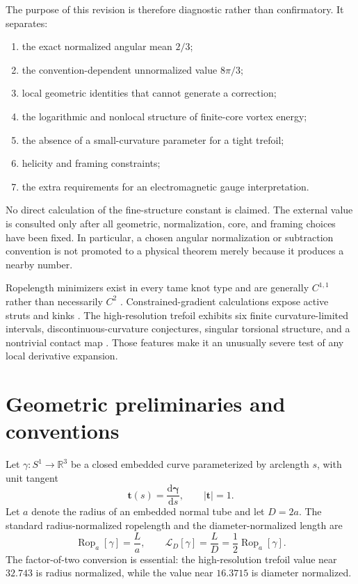 \documentclass[aps,pre,preprint,notitlepage,nofootinbib,superscriptaddress]{revtex4-2}
\newcommand{\dd}{\mathrm d}
\newcommand{\RR}{\mathbb R}
\newcommand{\Rop}{\operatorname{Rop}}
\newcommand{\calL}{\mathcal L}
\begin{document}
The purpose of this revision is therefore diagnostic rather than confirmatory.  It separates:
\begin{enumerate}[label=(\roman*)]
  \item the exact normalized angular mean $2/3$;
  \item the convention-dependent unnormalized value $8\pi/3$;
  \item local geometric identities that cannot generate a correction;
  \item the logarithmic and nonlocal structure of finite-core vortex energy;
  \item the absence of a small-curvature parameter for a tight trefoil;
  \item helicity and framing constraints;
  \item the extra requirements for an electromagnetic gauge interpretation.
\end{enumerate}

No direct calculation of the fine-structure constant is claimed.  The external value is consulted only after all geometric, normalization, core, and framing choices have been fixed.  In particular, a chosen angular normalization or subtraction convention is not promoted to a physical theorem merely because it produces a nearby number.

Ropelength minimizers exist in every tame knot type and are generally $C^{1,1}$ rather than necessarily $C^2$ \cite{CantarellaKusnerSullivan2002}.  Constrained-gradient calculations expose active struts and kinks \cite{AshtonCantarellaPiatekRawdon2011}.  The high-resolution trefoil exhibits six finite curvature-limited intervals, discontinuous-curvature conjectures, singular torsional structure, and a nontrivial contact map \cite{PrzybylPieranski2014}.  Those features make it an unusually severe test of any local derivative expansion.

\section{Geometric preliminaries and conventions}
\label{sec:geometry}

Let $\gamma:S^1\to\RR^3$ be a closed embedded curve parameterized by arclength $s$, with unit tangent
\begin{equation}
  \bm t(s)=\frac{\dd\bm\gamma}{\dd s},\qquad |\bm t|=1.
\end{equation}
Let $a$ denote the radius of an embedded normal tube and let $D=2a$.  The standard radius-normalized ropelength and the diameter-normalized length are
\begin{equation}
  \Rop_a[\gamma]=\frac{L}{a},\qquad
  \calL_D[\gamma]=\frac{L}{D}=\frac12\Rop_a[\gamma].
  \label{eq:diameter-normalized-v020}
\end{equation}
The factor-of-two conversion is essential: the high-resolution trefoil value near $32.743$ is radius normalized, while the value near $16.3715$ is diameter normalized.
\end{document}
